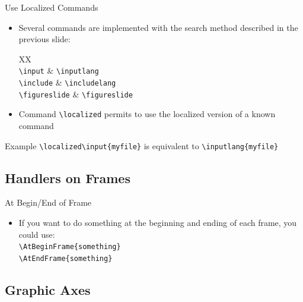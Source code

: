 \documentclass[english,sectioncirclenumberstyle]{ciadbeamer}
\begin{document}
\begin{frame}{Use Localized Commands}
	\begin{itemize}
	\item Several commands are implemented with the search method described in the previous slide:
		\begin{stabularx}[title={List of Localized Commands}]{XX}
			 \\
			\texttt{{\textbackslash}input} & \texttt{{\textbackslash}inputlang} \\
			\texttt{{\textbackslash}include} & \texttt{{\textbackslash}includelang} \\
			\texttt{{\textbackslash}figureslide} & \texttt{{\textbackslash}figureslide} \\
		\end{stabularx}
	\item Command \texttt{{\textbackslash}localized} permits to use the localized version of a known command
	\end{itemize}
	\begin{block}{Example}
		\texttt{{\textbackslash}localized{\textbackslash}input\{myfile\}} is equivalent to \texttt{{\textbackslash}inputlang\{myfile\}}
	\end{block}
\end{frame}

\subsection{Handlers on Frames}

\begin{frame}{At Begin/End of Frame}
	\begin{itemize}
	\item If you want to do something at the beginning and ending of each frame, you could use: \\
		\texttt{{\textbackslash}AtBeginFrame\{something\}} \\
		\texttt{{\textbackslash}AtEndFrame\{something\}}
	\end{itemize}
\end{frame}

\subsection{Graphic Axes}
\end{document}
